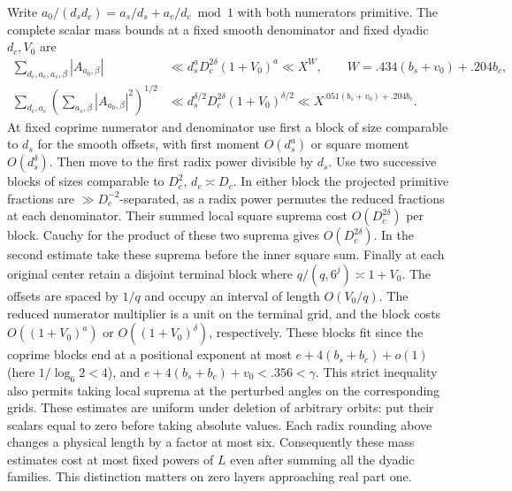 \documentclass[11pt,a4paper]{article}
\theoremstyle{paperplain}
\numberwithin{equation}{section}
\begin{document}
Write $a_0/(d_sd_c)=a_s/d_s+a_c/d_c\bmod1$ with both numerators
primitive. The complete scalar mass bounds at a fixed smooth
denominator and fixed dyadic $d_c,V_0$ are
\begin{align}
 \sum_{d_c,a_c,a_s,\beta}|A_{a_0,\beta}|
   &\ll d_s^aD_c^{2\delta}(1+V_0)^a\ll X^W,
       \qquad W=.434(b_s+v_0)+.204b_c ,
 \label{six:sixmask-lone}\\
 \sum_{d_c,a_c}\left(\sum_{a_s,\beta}|A_{a_0,\beta}|^2\right)^{1/2}
   &\ll d_s^{\delta/2}D_c^{2\delta}(1+V_0)^{\delta/2}
       \ll X^{.051(b_s+v_0)+.204b_c} .
 \label{six:sixmask-ltwo}
\end{align}
At fixed coprime numerator and denominator use first a block of
size comparable to $d_s$ for the smooth offsets, with first
moment $O(d_s^a)$ or square moment $O(d_s^\delta)$. Then move to
the first radix power divisible by $d_s$. Use two successive blocks
of sizes comparable to $D_c^2$, $d_c\asymp D_c$. In either block the
projected primitive fractions are $\gg D_c^{-2}$-separated, as a
radix power permutes the reduced fractions at each denominator.
Their summed local square suprema cost $O(D_c^{2\delta})$ per
block. Cauchy for the product of these two suprema gives
$O(D_c^{2\delta})$. In the second estimate take these suprema
before the inner square sum. Finally at each original center retain
a disjoint terminal block where $q/(q,6^j)\asymp1+V_0$. The offsets
are spaced by $1/q$ and occupy an interval of length $O(V_0/q)$.
The reduced numerator multiplier is a unit on the terminal grid,
and the block costs $O((1+V_0)^a)$ or $O((1+V_0)^\delta)$,
respectively. These blocks fit since the coprime blocks end at a
positional exponent at most $e+4(b_s+b_c)+o(1)$ (here
$1/\log_6 2<4$), and $e+4(b_s+b_c)+v_0<.356<\gamma$.
This strict inequality also permits taking local suprema at the
perturbed angles on the corresponding grids. These estimates are
uniform under deletion of arbitrary orbits: put their scalars equal
to zero before taking absolute values. Each radix rounding above
changes a physical length by a factor at most six. Consequently these
mass estimates cost at most fixed powers of $L$ even after summing all
the dyadic families. This distinction matters on zero layers approaching
real part one.
\end{document}
